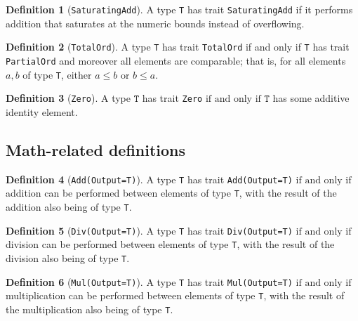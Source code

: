 \documentclass[11pt,a4paper]{article}
\theoremstyle{definition}
\newtheorem{definition}{Definition}[section]
\newcommand{\T}{\texttt{T}}
\newcommand{\iffText}{\text{if and only if}}
\begin{document}
\begin{definition}[\texttt{SaturatingAdd}]
    A type \texttt{T} has trait \texttt{SaturatingAdd} if it performs addition that saturates at the numeric bounds instead of overflowing.
\end{definition}

\begin{definition}[\texttt{TotalOrd}]
    A type \texttt{T} has trait \texttt{TotalOrd} if and only if \texttt{T} has trait \texttt{PartialOrd} and moreover all elements are comparable; that is, for all elements $a, b$ of type \texttt{T}, either $a \leq b$ or $b \leq a$.
    
    
\end{definition}

\begin{definition}[\texttt{Zero}]
A type $\T$ has trait \texttt{Zero} $\iffText$ $\T$ has some additive identity element.
\end{definition}

\subsection{Math-related definitions}
\begin{definition}[\texttt{Add(Output=T)}]
    A type \texttt{T} has trait \texttt{Add(Output=T)} $\iffText$ addition can be performed between elements of type \texttt{T}, with the result of the addition also being of type \texttt{T}.
\end{definition}

\begin{definition}[\texttt{Div(Output=T)}]
    A type \texttt{T} has trait \texttt{Div(Output=T)} $\iffText$ division can be performed between elements of type \texttt{T}, with the result of the division also being of type \texttt{T}.
\end{definition}

\begin{definition}[\texttt{Mul(Output=T)}]
    A type \texttt{T} has trait \texttt{Mul(Output=T)} $\iffText$ multiplication can be performed between elements of type \texttt{T}, with the result of the multiplication also being of type \texttt{T}.
\end{definition}
\end{document}
